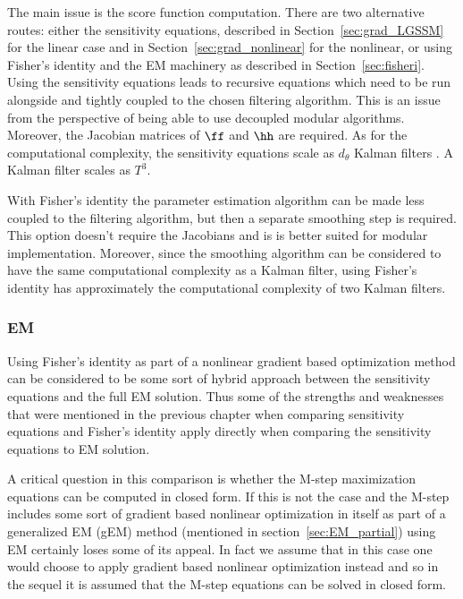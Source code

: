 The main issue is the score function computation. There are two alternative routes:
either the sensitivity equations, described in Section~\ref{sec:grad_LGSSM} for the linear
case and in Section~\ref{sec:grad_nonlinear} for the nonlinear, or using
Fisher's identity and the EM machinery as described in Section~\ref{sec:fisheri}.
Using the sensitivity equations leads to recursive equations which need
to be run alongside and tightly coupled to the chosen filtering algorithm.
This is an issue from the perspective of being able to use decoupled modular
algorithms. Moreover, the Jacobian matrices of $\ff$ and $\hh$ are required.
As for the computational complexity, the sensitivity equations scale
as $d_\theta$ Kalman filters \parencite{Cappe2005, Olsson2007}.
A Kalman filter scales as $T^3$. 

With Fisher's identity the parameter estimation algorithm can be made 
less coupled to the filtering algorithm, but then a separate smoothing
step is required. This option doesn't require the Jacobians and is
is better suited for modular implementation. Moreover, since
the smoothing algorithm can be considered to have the same computational
complexity as a Kalman filter, using Fisher's identity has approximately
the computational complexity of two Kalman filters.

  
\subsubsection*{EM}
  
Using Fisher's identity as part of a nonlinear gradient based optimization method 
can be considered to be some sort of hybrid approach between the sensitivity equations
and the full EM solution. Thus some of the strengths and weaknesses that were
mentioned in the previous chapter when comparing sensitivity equations and Fisher's identity
apply directly when comparing the sensitivity equations to EM solution.

A critical question in this comparison is whether the M-step maximization equations
can be computed in closed form. If this is not the case and the M-step includes
some sort of gradient based nonlinear optimization in itself as part of a generalized
EM (gEM) method (mentioned in section~\ref{sec:EM_partial}) using EM certainly loses
some of its appeal. In fact we assume that in this case one would choose to apply
gradient based nonlinear optimization instead and so in the sequel it is assumed
that the M-step equations can be solved in closed form.

